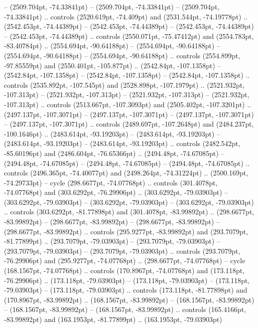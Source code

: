  -- (2509.704pt, -74.33841pt)
 -- (2509.704pt, -74.33841pt)
 -- (2509.704pt, -74.33841pt) .. controls (2520.619pt, -74.409pt) and (2531.544pt, -74.19778pt) .. (2542.453pt, -74.44389pt)
 -- (2542.453pt, -74.44389pt)
 -- (2542.453pt, -74.44389pt)
 -- (2542.453pt, -74.44389pt) .. controls (2550.071pt, -75.47412pt) and (2554.783pt, -83.40784pt) .. (2554.694pt, -90.64188pt)
 -- (2554.694pt, -90.64188pt)
 -- (2554.694pt, -90.64188pt)
 -- (2554.694pt, -90.64188pt) .. controls (2554.899pt, -97.85559pt) and (2550.401pt, -105.877pt) .. (2542.84pt, -107.1358pt)
 -- (2542.84pt, -107.1358pt)
 -- (2542.84pt, -107.1358pt)
 -- (2542.84pt, -107.1358pt) .. controls (2535.892pt, -107.545pt) and (2528.898pt, -107.1979pt) .. (2521.932pt, -107.313pt)
 -- (2521.932pt, -107.313pt)
 -- (2521.932pt, -107.313pt)
 -- (2521.932pt, -107.313pt) .. controls (2513.667pt, -107.3093pt) and (2505.402pt, -107.3201pt) .. (2497.137pt, -107.3071pt)
 -- (2497.137pt, -107.3071pt)
 -- (2497.137pt, -107.3071pt)
 -- (2497.137pt, -107.3071pt) .. controls (2489.697pt, -107.2648pt) and (2484.237pt, -100.1646pt) .. (2483.614pt, -93.19203pt)
 -- (2483.614pt, -93.19203pt)
 -- (2483.614pt, -93.19203pt)
 -- (2483.614pt, -93.19203pt) .. controls (2482.542pt, -85.60196pt) and (2486.604pt, -76.65366pt) .. (2494.48pt, -74.67085pt)
 -- (2494.48pt, -74.67085pt)
 -- (2494.48pt, -74.67085pt)
 -- (2494.48pt, -74.67085pt) .. controls (2496.365pt, -74.40077pt) and (2498.264pt, -74.31224pt) .. (2500.169pt, -74.29733pt) -- cycle
(298.6677pt, -74.07768pt) .. controls (301.4078pt, -74.07768pt) and (303.6292pt, -76.29906pt) .. (303.6292pt, -79.03903pt)
 -- (303.6292pt, -79.03903pt)
 -- (303.6292pt, -79.03903pt)
 -- (303.6292pt, -79.03903pt) .. controls (303.6292pt, -81.77898pt) and (301.4078pt, -83.99892pt) .. (298.6677pt, -83.99892pt)
 -- (298.6677pt, -83.99892pt)
 -- (298.6677pt, -83.99892pt)
 -- (298.6677pt, -83.99892pt) .. controls (295.9277pt, -83.99892pt) and (293.7079pt, -81.77899pt) .. (293.7079pt, -79.03903pt)
 -- (293.7079pt, -79.03903pt)
 -- (293.7079pt, -79.03903pt)
 -- (293.7079pt, -79.03903pt) .. controls (293.7079pt, -76.29906pt) and (295.9277pt, -74.07768pt) .. (298.6677pt, -74.07768pt) -- cycle
(168.1567pt, -74.07768pt) .. controls (170.8967pt, -74.07768pt) and (173.118pt, -76.29906pt) .. (173.118pt, -79.03903pt)
 -- (173.118pt, -79.03903pt)
 -- (173.118pt, -79.03903pt)
 -- (173.118pt, -79.03903pt) .. controls (173.118pt, -81.77898pt) and (170.8967pt, -83.99892pt) .. (168.1567pt, -83.99892pt)
 -- (168.1567pt, -83.99892pt)
 -- (168.1567pt, -83.99892pt)
 -- (168.1567pt, -83.99892pt) .. controls (165.4166pt, -83.99892pt) and (163.1953pt, -81.77899pt) .. (163.1953pt, -79.03903pt)
